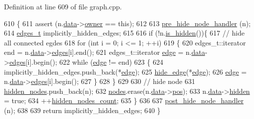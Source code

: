 Definition at line 609 of file graph.\+cpp.


\begin{DoxyCode}
610 \{
611     assert (n.\mbox{\hyperlink{classnode_a4ae3d54ebb61be3a102bedf5b91bef75}{data}}->\mbox{\hyperlink{classnode__data_a20acb07c56fa28df6cbdbf3b0a02cb66}{owner}} == \textcolor{keyword}{this});
612 
613     \mbox{\hyperlink{classgraph_ac169b1dca0b01c97e683302b3908fd49}{pre\_hide\_node\_handler}} (n);
614     \mbox{\hyperlink{edge_8h_a8f9587479bda6cf612c103494b3858e3}{edges\_t}} implicitly\_hidden\_edges;
615     
616     \textcolor{keywordflow}{if} (!n.\mbox{\hyperlink{classnode_af948e15fd00a31e67928c9061acda582}{is\_hidden}}())\{
617     \textcolor{comment}{// hide all connected egdes}
618     \textcolor{keywordflow}{for} (\textcolor{keywordtype}{int} i = 0; i <= 1; ++i)
619     \{
620         edges\_t::iterator end = n.\mbox{\hyperlink{classnode_a4ae3d54ebb61be3a102bedf5b91bef75}{data}}->\mbox{\hyperlink{classnode__data_a91690d6d2594423c2cdf8ea083c8bd75}{edges}}[i].end();
621         edges\_t::iterator \mbox{\hyperlink{classedge}{edge}} = n.\mbox{\hyperlink{classnode_a4ae3d54ebb61be3a102bedf5b91bef75}{data}}->\mbox{\hyperlink{classnode__data_a91690d6d2594423c2cdf8ea083c8bd75}{edges}}[i].begin();
622         \textcolor{keywordflow}{while} (\mbox{\hyperlink{classedge}{edge}} != end)
623         \{
624         implicitly\_hidden\_edges.push\_back(*\mbox{\hyperlink{classedge}{edge}});
625         \mbox{\hyperlink{classgraph_ab2f8520bcac080d73c55228fecc61825}{hide\_edge}}(*\mbox{\hyperlink{classedge}{edge}});
626         \mbox{\hyperlink{classedge}{edge}} = n.\mbox{\hyperlink{classnode_a4ae3d54ebb61be3a102bedf5b91bef75}{data}}->\mbox{\hyperlink{classnode__data_a91690d6d2594423c2cdf8ea083c8bd75}{edges}}[i].begin();
627         \}
628     \}
629 
630     \textcolor{comment}{// hide node}
631     \mbox{\hyperlink{classgraph_a7a3f2842a409a4b35ca8ef34598df9ca}{hidden\_nodes}}.push\_back(n);
632     \mbox{\hyperlink{classgraph_a4ea0592e8eb7c26c5abad24546907726}{nodes}}.erase(n.\mbox{\hyperlink{classnode_a4ae3d54ebb61be3a102bedf5b91bef75}{data}}->\mbox{\hyperlink{classnode__data_ab3deb00e39c12058e58a99a38507f344}{pos}});
633     n.\mbox{\hyperlink{classnode_a4ae3d54ebb61be3a102bedf5b91bef75}{data}}->\mbox{\hyperlink{classnode__data_a0a841a84f5038562908d726392ce1b55}{hidden}} = \textcolor{keyword}{true};
634     ++\mbox{\hyperlink{classgraph_aa72548d972d226a69f7f8fb92b363860}{hidden\_nodes\_count}};
635     \}
636 
637     \mbox{\hyperlink{classgraph_a50cb72a1e81d0a3d68965a1e6070edb3}{post\_hide\_node\_handler}} (n);
638 
639     \textcolor{keywordflow}{return} implicitly\_hidden\_edges;
640 \}
\end{DoxyCode}

